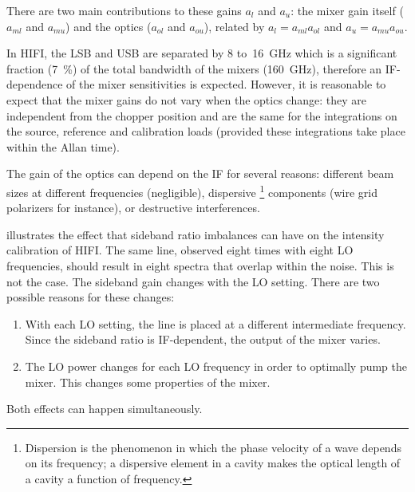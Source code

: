 There are two main contributions to these gains $a_l$ and $a_u$:
the mixer gain itself ($a_{ml}$ and $a_{mu}$)
and the optics ($a_{ol}$ and $a_{ou}$), related by
$a_l = a_{ml} a_{ol}$ and $a_u = a_{mu} a_{ou}$.

In HIFI, the LSB and USB are separated by \num{8} to~\SI{16}{\giga\hertz}
which is a significant fraction (\SI{7}{\percent}) of the total bandwidth of the mixers (\SI{160}{\giga\hertz}),
therefore an IF-dependence of the mixer sensitivities is expected.
However, it is reasonable to expect that the mixer gains do not vary when the optics change: they are independent from the chopper position and are the same for the integrations on the source, reference and calibration loads (provided these integrations take place within the Allan time).

The gain of the optics can depend on the IF for several reasons:
different beam sizes at different frequencies (negligible), dispersive%
\footnote{
    Dispersion is the phenomenon in which the phase velocity of a wave depends on its frequency; a dispersive element in a cavity makes the optical length of a cavity a function of frequency.
}
components (wire grid polarizers for instance), or destructive interferences.

 illustrates the effect that sideband ratio imbalances can have on the intensity calibration of HIFI.
The same line, observed eight times with eight LO frequencies, should result in eight spectra that overlap within the noise.
This is not the case.
The sideband gain changes with the LO setting.
There are two possible reasons for these changes:
\begin{enumerate}
    \item With each LO setting, the line is placed at a different intermediate frequency.  Since the sideband ratio is IF-dependent, the output of the mixer varies.
    \item The LO power changes for each LO frequency in order to optimally pump the mixer.
    This changes some properties of the mixer.
\end{enumerate}
Both effects can happen simultaneously.

